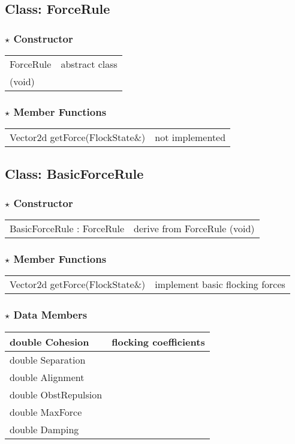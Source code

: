 \documentclass[onecolumn,10pt]{article}
\begin{document}
\subsection{Class: ForceRule}
\subsubsection*{$\star$ Constructor}
\begin{tabular}{l|l}
ForceRule   & abstract class \\
(void)
\end{tabular}

\subsubsection*{$\star$ Member Functions}

\begin{tabular}{l|l}
Vector2d getForce(FlockState\&)  & not implemented
\end{tabular}

\subsection{Class: BasicForceRule}

\subsubsection*{$\star$ Constructor}
\begin{tabular}{l|l}
BasicForceRule : ForceRule      & derive from ForceRule
(void)                        
\end{tabular}

\subsubsection*{$\star$ Member Functions}

\begin{tabular}{l|l}
Vector2d getForce(FlockState\&) & implement basic flocking forces
\end{tabular}

\subsubsection*{$\star$ Data Members}

\begin{tabular}{l|l}
double Cohesion     &  flocking coefficients \\\hline
double Separation & \\\hline
double Alignment & \\\hline
double ObstRepulsion & \\\hline
double MaxForce &  \\\hline
double Damping & 
\end{tabular}
\end{document}
